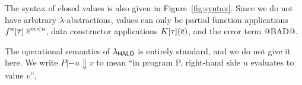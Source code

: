 The syntax of closed values is also given in Figure~\ref{fig:syntax}. Since we do not
have arbitrary $\lambda$-abstractions, values can only be partial function applications
$f^n[\overline{\tau}]\;\overline{e}^{m < n}$, data constructor applications $K[\tau](\overline{e})$,
and the error term @BAD@.

The operational semantics of $\lambda_{\sf HALO}$ is entirely standard, and we do not give it here.
We write $P |- u \Downarrow v$ to mean ``in program P, right-hand side $u$ evaluates to
value $v$'',

%
